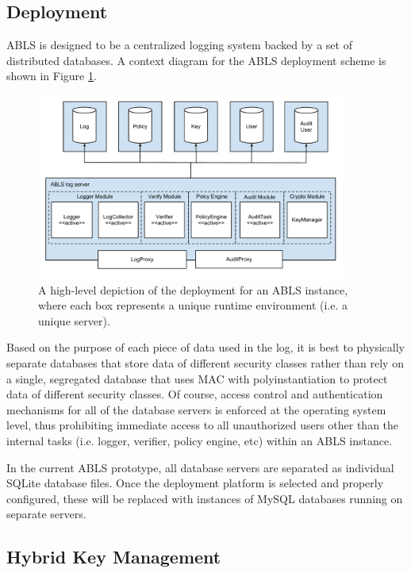 \documentclass{sig-alternate}
\begin{document}
\subsection{Deployment}
\label{sec:deployment}
ABLS is designed to be a centralized logging system backed by a set of distributed databases. A context
diagram for the ABLS deployment scheme is shown in Figure \ref{fig:deployment}.

\begin{figure}[htb!]
\begin{center}
\includegraphics[width=4in]{images/deployment.pdf}
\caption{A high-level depiction of the deployment for an ABLS instance, where each box represents a unique runtime environment (i.e. a unique server).}
\label{fig:deployment}
\end{center}
\end{figure}

Based on the purpose of each piece of data used in the log, it is best to physically separate databases
that store data of different security classes rather than rely on a single, segregated database that uses MAC with 
polyinstantiation to protect data of different security classes. Of course, access control
and authentication mechanisms for all of the database servers is enforced at the operating system level, thus
prohibiting immediate access to all unauthorized users other than the internal tasks (i.e. logger, verifier, policy engine, etc) 
within an ABLS instance. 

In the current ABLS prototype, all database servers are separated as individual SQLite database files. Once
the deployment platform is selected and properly configured, these will be replaced with instances of MySQL 
databases running on separate servers.

\subsection{Hybrid Key Management}
\label{sec:keyMgmt}
\end{document}
